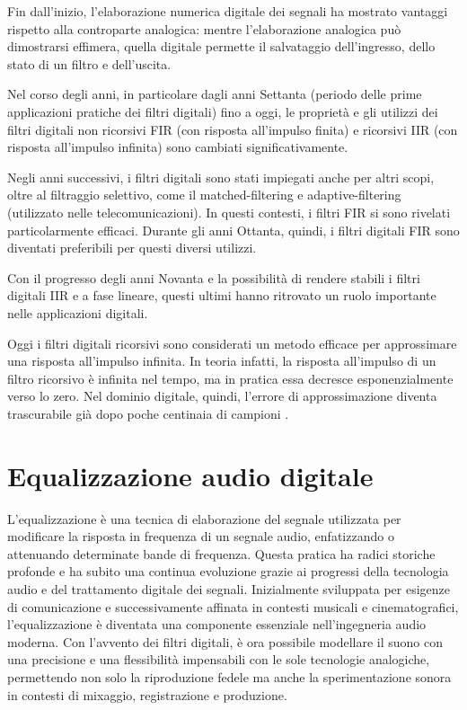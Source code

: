 \documentclass[12pt]{report}
\begin{document}
Fin dall'inizio, l'elaborazione numerica digitale dei segnali ha mostrato vantaggi rispetto alla controparte analogica: mentre l’elaborazione analogica può dimostrarsi effimera, quella digitale permette il salvataggio dell'ingresso, dello stato di un filtro e dell'uscita.

Nel corso degli anni, in particolare dagli anni Settanta (periodo delle prime applicazioni pratiche dei filtri digitali) fino a oggi, le proprietà e gli utilizzi dei filtri digitali non ricorsivi FIR (con risposta all’impulso finita) e ricorsivi IIR (con risposta all’impulso infinita) sono cambiati significativamente.

Negli anni successivi, i filtri digitali sono stati impiegati anche per altri scopi, oltre al filtraggio selettivo, come il matched-filtering e adaptive-filtering (utilizzato nelle telecomunicazioni). In questi contesti, i filtri FIR si sono rivelati particolarmente efficaci. Durante gli anni Ottanta, quindi, i filtri digitali FIR sono diventati preferibili per questi diversi utilizzi.

Con il progresso degli anni Novanta e la possibilità di rendere stabili i filtri digitali IIR e a fase lineare, questi ultimi hanno ritrovato un ruolo importante nelle applicazioni digitali.

Oggi i filtri digitali ricorsivi sono considerati un metodo efficace per approssimare una risposta all’impulso infinita. In teoria infatti, la risposta all’impulso di un filtro ricorsivo è infinita nel tempo, ma in pratica essa decresce esponenzialmente verso lo zero. Nel dominio digitale, quindi, l’errore di approssimazione diventa trascurabile già dopo poche centinaia di campioni \parencite{rader2006rise}.

\section{Equalizzazione audio digitale}
L’equalizzazione è una tecnica di elaborazione del segnale utilizzata per modificare la risposta in frequenza di un segnale audio, enfatizzando o attenuando determinate bande di frequenza. Questa pratica ha radici storiche profonde e ha subito una continua evoluzione grazie ai progressi della tecnologia audio e del trattamento digitale dei segnali. Inizialmente sviluppata per esigenze di comunicazione e successivamente affinata in contesti musicali e cinematografici, l’equalizzazione è diventata una componente essenziale nell’ingegneria audio moderna. Con l’avvento dei filtri digitali, è ora possibile modellare il suono con una precisione e una flessibilità impensabili con le sole tecnologie analogiche, permettendo non solo la riproduzione fedele ma anche la sperimentazione sonora in contesti di mixaggio, registrazione e produzione.
\end{document}
